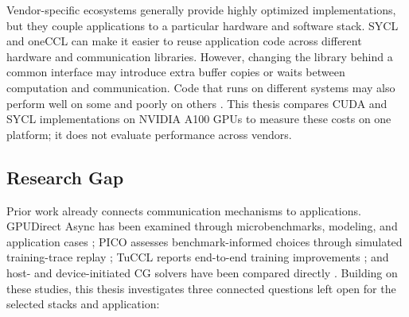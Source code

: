 Vendor-specific ecosystems generally provide highly optimized implementations, but they couple applications to a particular hardware and software stack. SYCL and oneCCL can make it easier to reuse application code across different hardware and communication libraries. However, changing the library behind a common interface may introduce extra buffer copies or waits between computation and communication. Code that runs on different systems may also perform well on some and poorly on others \cite{hammond_comparative_2019,shen_sycl_2026}. This thesis compares \ac{CUDA} and SYCL implementations on NVIDIA A100 GPUs to measure these costs on one platform; it does not evaluate performance across vendors.

\subsection{Research Gap}

Prior work already connects communication mechanisms to applications. GPUDirect Async has been examined through microbenchmarks, modeling, and application cases \cite{agostini_gpudirect_2018}; PICO assesses benchmark-informed choices through simulated training-trace replay \cite{pasqualoni_pico_2026}; TuCCL reports end-to-end training improvements \cite{li_tuccl_2025}; and host- and device-initiated CG solvers have been compared directly \cite{trotter_cpu-_2025}. Building on these studies, this thesis investigates three connected questions left open for the selected stacks and application:

